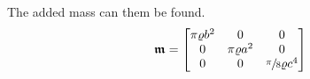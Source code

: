 The added mass can them be found.
\[
\bm{\mathfrak{m}} = \begin{bmatrix}
  \pi\varrho b^2 & 0 & 0\\
  0 & \pi\varrho a^2 & 0\\
  0 & 0 & \sfrac{\pi}{8}\varrho c^4
  \end{bmatrix}
\]
